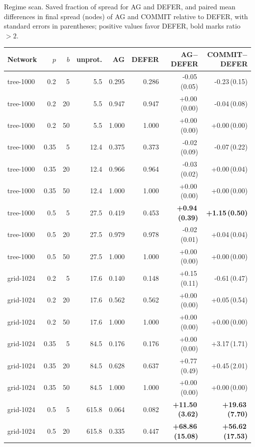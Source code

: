 \documentclass[ijoc,sglanonrev]{informs4}
\begin{document}
\begin{table}[h]
\TABLE
{Regime scan. Saved fraction of spread for AG and DEFER, and paired mean
differences in final spread (nodes) of AG and COMMIT relative to DEFER, with
standard errors in parentheses; positive values favor DEFER, bold marks ratio
$>2$.\label{tab:regime}}
{\footnotesize
\begin{tabular}{lrrrrrrr}
\hline
Network & $p$ & $b$ & unprot. & AG & DEFER & AG$-$DEFER & COMMIT$-$DEFER \\
\hline
tree-1000 & 0.2 & 5 & 5.5 & 0.295 & 0.286 & -0.05\,(0.05) & -0.23\,(0.15) \\
tree-1000 & 0.2 & 20 & 5.5 & 0.947 & 0.947 & +0.00\,(0.00) & -0.04\,(0.08) \\
tree-1000 & 0.2 & 50 & 5.5 & 1.000 & 1.000 & +0.00\,(0.00) & +0.00\,(0.00) \\
tree-1000 & 0.35 & 5 & 12.4 & 0.375 & 0.373 & -0.02\,(0.09) & -0.07\,(0.22) \\
tree-1000 & 0.35 & 20 & 12.4 & 0.966 & 0.964 & -0.03\,(0.02) & +0.00\,(0.04) \\
tree-1000 & 0.35 & 50 & 12.4 & 1.000 & 1.000 & +0.00\,(0.00) & +0.00\,(0.00) \\
tree-1000 & 0.5 & 5 & 27.5 & 0.419 & 0.453 & \textbf{+0.94\,(0.39)} & \textbf{+1.15\,(0.50)} \\
tree-1000 & 0.5 & 20 & 27.5 & 0.979 & 0.978 & -0.02\,(0.01) & +0.04\,(0.04) \\
tree-1000 & 0.5 & 50 & 27.5 & 1.000 & 1.000 & +0.00\,(0.00) & +0.00\,(0.00) \\
grid-1024 & 0.2 & 5 & 17.6 & 0.140 & 0.148 & +0.15\,(0.11) & -0.61\,(0.47) \\
grid-1024 & 0.2 & 20 & 17.6 & 0.562 & 0.562 & +0.00\,(0.00) & +0.05\,(0.54) \\
grid-1024 & 0.2 & 50 & 17.6 & 1.000 & 1.000 & +0.00\,(0.00) & +0.00\,(0.00) \\
grid-1024 & 0.35 & 5 & 84.5 & 0.176 & 0.176 & +0.00\,(0.00) & +3.17\,(1.71) \\
grid-1024 & 0.35 & 20 & 84.5 & 0.628 & 0.637 & +0.77\,(0.49) & +0.45\,(2.01) \\
grid-1024 & 0.35 & 50 & 84.5 & 1.000 & 1.000 & +0.00\,(0.00) & +0.00\,(0.00) \\
grid-1024 & 0.5 & 5 & 615.8 & 0.064 & 0.082 & \textbf{+11.50\,(3.62)} & \textbf{+19.63\,(7.70)} \\
grid-1024 & 0.5 & 20 & 615.8 & 0.335 & 0.447 & \textbf{+68.86\,(15.08)} & \textbf{+56.62\,(17.53)} \\

\end{tabular}}
\end{table}
\end{document}
